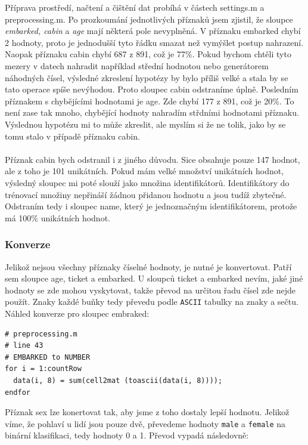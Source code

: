 \documentclass[a4]{article}
\begin{document}
Příprava prostředí, načtení a čištění dat probíhá v částech settings.m a preprocessing.m. Po prozkoumání jednotlivých příznaků jsem zjistil, že sloupce \textit{embarked, cabin} a \textit{age} mají některá pole nevyplněná. V příznaku embarked chybí 2 hodnoty, proto je jednodušší tyto řádku smazat než vymýšlet postup nahrazení. Naopak příznaku cabin chybí 
687 z 891, což je 77\%. Pokud bychom chtěli tyto mezery v datech nahradit například střední hodnotou nebo generátorem náhodných čísel, výsledné zkreslení hypotézy by bylo příliš velké a stala by se tato operace spíše nevýhodou. Proto sloupec cabin odstraníme úplně. Posledním příznakem s chybějícími hodnotami je age. Zde chybí 177 z 891, což je 20\%. To není zase tak mnoho, chybějící hodnoty nahradím střdními hodnotami příznaku. Výslednou hypotézu mi to může zkreslit, ale myslím si že ne tolik, jako by se tomu stalo v případě příznaku cabin.
\\\\
Příznak cabin bych odstranil i z jiného důvodu. Sice obsahuje pouze 147 hodnot, ale z toho je 101 unikátních. Pokud mám velké množství unikátních hodnot, výsledný sloupec mi poté slouží jako množina identifikátorů. Identifikátory do trénovací množiny nepřináší žádnou přidanou hodnotu a jsou tudíž zbytečné. Odstraním tedy i sloupec name, který je jednoznačným identifikátorem, protože má 100\% unikátních hodnot.

\subsubsection{Konverze}
Jelikož nejsou všechny příznaky číselné hodnoty, je nutné je konvertovat. Patří sem sloupce age, ticket a embarked. U sloupců ticket a embarked nevím, jaké jiné hodnoty se zde mohou vyskytovat, takže převod na určitou řadu čísel zde nejde použít. Znaky každé buňky tedy převedu podle \texttt{ASCII} tabulky na znaky a sečtu. Náhled konverze pro sloupec embraked:

\begin{lstlisting}
# preprocessing.m
# line 43 
# EMBARKED to NUMBER
for i = 1:countRow
  data(i, 8) = sum(cell2mat (toascii(data(i, 8))));
endfor
\end{lstlisting}

\noindent Příznak sex lze konertovat tak, aby jsme z toho dostaly lepší hodnotu. Jelikož víme, že pohlaví u lidí jsou pouze dvě, převedeme hodnoty \texttt{male} a \texttt{female} na binární klasifikaci, tedy hodnoty 0 a 1. Převod vypadá následovně:
\end{document}
